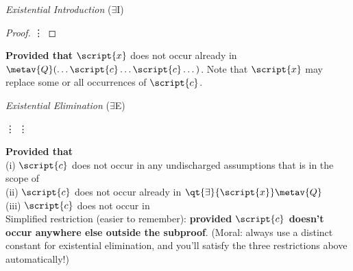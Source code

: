 \begin{multicols}{2}
\vfill\null
\columnbreak

\textit{Existential Introduction} ($\exists$I)

\begin{proof}
	 {\hspace{2em} \vdots}
 
\end{proof}

\textbf{Provided that} $\script{x}$ does not occur already in $\metav{Q}(\dots \script{c} \dots \script{c} \dots)$. Note that $\script{x}$ may replace some or all occurrences of $\script{c}$.





\textit{Existential Elimination} ($\exists$E)

\begin{fitchproof}
	 {\hspace{2em} \vdots}
	\open	
		 
		 {\hspace{2em} \vdots}
	\close
	 
\end{fitchproof}

\textbf{Provided that} \\
(i)  $\script{c}$ does not occur in any undischarged assumptions that  is in the scope of \\
(ii) $\script{c}$ does not occur already in $\qt{\exists}{\script{x}} \metav{Q}$ \\
(iii) $\script{c}$ does not occur in \metaB{} \\

\footnotesize{Simplified restriction (easier to remember): \textbf{provided $\script{c}$ doesn't occur anywhere else outside the subproof}. (Moral: always use a distinct constant for existential elimination, and you'll satisfy the three restrictions above automatically!)}

\end{multicols} %






































